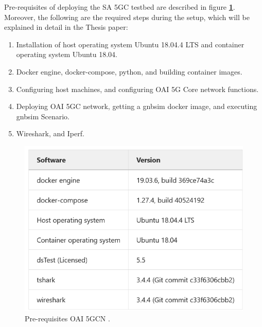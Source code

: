 Pre-requisites of deploying the SA 5GC testbed are described in figure \textbf{\ref{fig:Pre-requisites-oai-cn5g-fed}}. Moreover, the following are the required steps during the setup, which will be explained in detail in the Thesis paper:
\begin{enumerate}
    \item Installation of host operating system Ubuntu 18.04.4 LTS and container operating system Ubuntu 18.04.
    \item Docker engine,  docker-compose, python, and building container images.
    \item Configuring host machines, and configuring OAI 5G Core network functions.
    \item   Deploying OAI 5GC network, getting a gnbsim docker image, and executing gnbsim Scenario.
    \item  Wireshark, and Iperf.
\end{enumerate}
 




\begin{figure}
\centering
\includegraphics[scale=0.40]{images/Pre-requisites-oai-cn5g-fed.png}
\caption{Pre-requisites OAI 5GCN  \cite{openairinterface2014}.}
\label{fig:Pre-requisites-oai-cn5g-fed}
\end{figure}



 
     
     

